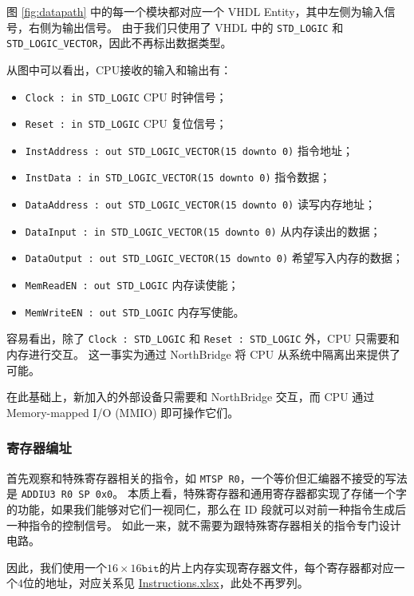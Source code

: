 \documentclass{article}
\begin{document}
图 \ref{fig:datapath} 中的每一个模块都对应一个 VHDL Entity，其中左侧为输入信号，右侧为输出信号。
由于我们只使用了 VHDL 中的 \texttt{STD_LOGIC} 和 \texttt{STD_LOGIC_VECTOR}，因此不再标出数据类型。

从图中可以看出，CPU接收的输入和输出有：
\begin{itemize}
    \item \texttt{Clock : in STD_LOGIC} CPU 时钟信号；
    \item \texttt{Reset : in STD_LOGIC} CPU 复位信号；
    \item \texttt{InstAddress : out STD_LOGIC_VECTOR(15 downto 0)} 指令地址；
    \item \texttt{InstData : in STD_LOGIC_VECTOR(15 downto 0)} 指令数据；
    \item \texttt{DataAddress : out STD_LOGIC_VECTOR(15 downto 0)} 读写内存地址；
    \item \texttt{DataInput : in STD_LOGIC_VECTOR(15 downto 0)} 从内存读出的数据；
    \item \texttt{DataOutput : out STD_LOGIC_VECTOR(15 downto 0)} 希望写入内存的数据；
    \item \texttt{MemReadEN : out STD_LOGIC} 内存读使能；
    \item \texttt{MemWriteEN : out STD_LOGIC} 内存写使能。
\end{itemize}

容易看出，除了 \texttt{Clock : STD_LOGIC} 和 \texttt{Reset : STD_LOGIC} 外，CPU 只需要和内存进行交互。
这一事实为通过 NorthBridge 将 CPU 从系统中隔离出来提供了可能。

在此基础上，新加入的外部设备只需要和 NorthBridge 交互，而 CPU 通过 Memory-mapped I/O (MMIO) 即可操作它们。

\subsubsection{寄存器编址}

首先观察和特殊寄存器相关的指令，如 \texttt{MTSP R0}，一个等价但汇编器不接受的写法是 \texttt{ADDIU3 R0 SP 0x0}。
本质上看，特殊寄存器和通用寄存器都实现了存储一个字的功能，如果我们能够对它们一视同仁，那么在 ID 段就可以对前一种指令生成后一种指令的控制信号。
如此一来，就不需要为跟特殊寄存器相关的指令专门设计电路。

因此，我们使用一个$16 \times 16\texttt{bit}$的片上内存实现寄存器文件，每个寄存器都对应一个$4$位的地址，对应关系见 \href{run:./Instructions.xlsx}{Instructions.xlsx}，此处不再罗列。
\end{document}

